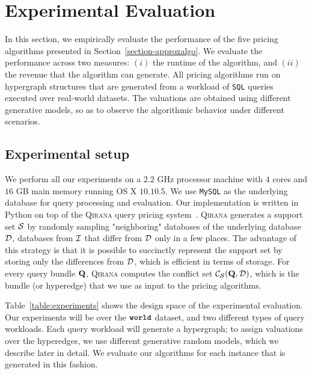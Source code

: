 \section{Experimental Evaluation}

In this section, we empirically evaluate the performance of the five pricing algorithms presented 
in Section~\ref{section-approxalgo}. We evaluate the performance across two measures: $(i)$ the runtime of
the algorithm, and $(ii)$ the revenue that the algorithm can generate. 
All pricing algorithms run on hypergraph structures that are generated from a workload of
\texttt{SQL} queries executed over real-world datasets. The valuations are obtained using different
 generative models, so as to observe the algorithmic behavior under different scenarios.


\subsection{Experimental setup}

We perform all our experiments on a $2.2$ GHz processor machine with $4$ cores and $16$ GB main memory running OS X $10.10.5$. We use \texttt{MySQL} as the underlying database for query processing and evaluation. Our implementation is written in \textsf{Python} on top of the \textsc{Qirana} query pricing system~\cite{deep2017qirana}. 
\textsc{Qirana} generates a support set $\mathcal{S}$ by randomly sampling "neighboring" databases of the
underlying database $\mathcal{D}$, \ie databases from $\mathcal{I}$ that differ from $\mathcal{D}$ only in a few places.
The advantage of this strategy is that it is possible to succinctly represent the support set by 
storing only the differences from $\mathcal{D}$, which is efficient in terms of storage.
For every query bundle $\mathbf{Q}$, \textsc{Qirana} computes the conflict set ${\mathcal{C}}_{\mathcal{S}}(\mathbf{Q},\mathcal{D})$, which
is the bundle (or hyperedge) that we use as input to the pricing algorithms.

Table~\ref{table:experiments} shows the design space of the experimental evaluation. 
Our experiments will be over the $\texttt{\bfseries world}$ dataset, 
and two different types of query workloads. Each query workload will generate a 
hypergraph; to assign valuations over the hyperedges, we use different generative random
models, which we describe later in detail. We evaluate our algorithms for each instance that is
generated in this fashion. 

